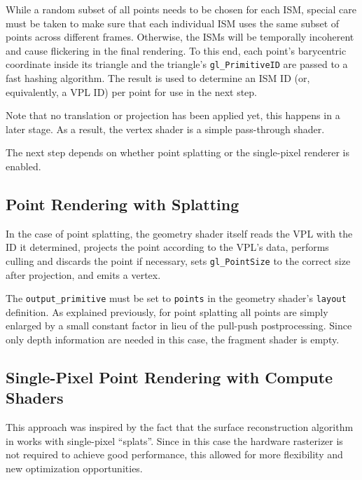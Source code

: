
While a random subset of all points needs to be chosen for each ISM, special care must be taken to make sure that each individual ISM uses the same subset of points across different frames. Otherwise, the ISMs will be temporally incoherent and cause flickering in the final rendering. To this end, each point's barycentric coordinate inside its triangle and the triangle's \texttt{gl\_PrimitiveID} are passed to a fast hashing algorithm. The result is used to determine an ISM ID (or, equivalently, a VPL ID) per point for use in the next step.

Note that no translation or projection has been applied yet, this happens in a later stage. As a result, the vertex shader is a simple pass-through shader.

The next step depends on whether point splatting or the single-pixel renderer is enabled.



\subsection{Point Rendering with Splatting}
\label{sec:impl:splatting}

In the case of point splatting, the geometry shader itself reads the VPL with the ID it determined, projects the point according to the VPL's data, performs culling and discards the point if necessary, sets \texttt{gl\_PointSize} to the correct size after projection, and emits a vertex.

The \texttt{output\_primitive} must be set to \texttt{points} in the geometry shader's \texttt{layout} definition. As explained previously, for point splatting all points are simply enlarged by a small constant factor in lieu of the pull-push postprocessing. Since only depth information are needed in this case, the fragment shader is empty.



\subsection{Single-Pixel Point Rendering with Compute Shaders}
\label{sec:impl:singlePixelRendering}

This approach was inspired by the fact that the surface reconstruction algorithm in \citet{Marroquim:2007:reconstruction} works with single-pixel ``splats''. Since in this case the hardware rasterizer is not required to achieve good performance, this allowed for more flexibility and new optimization opportunities.

